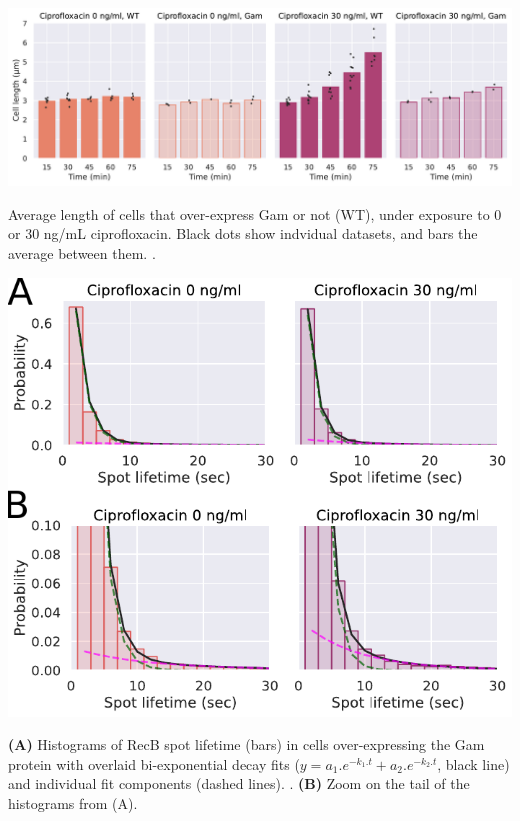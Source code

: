 \begin{suppfigure*}[htbp]
    \begin{center}
    \includegraphics[width=\linewidth]{SI_Figures/Cell_length_Gam.pdf}
    \end{center}
    \caption{Average length of cells that over-express Gam or not (WT), under exposure to 0 or 30 ng/mL ciprofloxacin. Black dots show indvidual datasets, and bars the average between them. .}
    \label{SIFig:Gam_cell_length}
\end{suppfigure*}

\begin{suppfigure*}[htbp]
    \begin{center}
    \includegraphics[width=0.6\linewidth]{SI_Figures/Gam_lifetimes_fits.pdf}
    \end{center}
    \caption{\textbf{(A)} Histograms of RecB spot lifetime (bars) in cells over-expressing the Gam protein with overlaid bi-exponential decay fits ($y=a_1.e^{-k_1.t} + a_2.e^{-k_2.t}$, black line) and individual fit components (dashed lines). .  \textbf{(B)} Zoom on the tail of the histograms from (A).}
    \label{SIFig:Gam_RecB_lifetimes_fits}
\end{suppfigure*}

